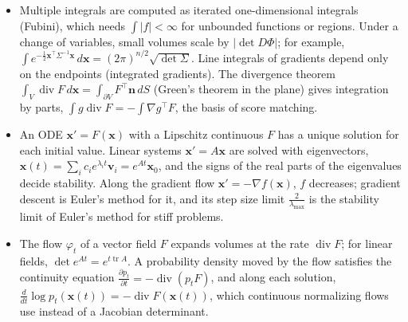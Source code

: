 \documentclass[11pt]{article}
\theoremstyle{definition}
\theoremstyle{plain}
\theoremstyle{remark}
\DeclareMathOperator{\tr}{tr}
\DeclareMathOperator{\Div}{div}
\begin{document}
\begin{itemize}[leftmargin=*]
    \item Multiple integrals are computed as iterated one-dimensional integrals (Fubini), which needs $\int |f| < \infty$ for unbounded functions or regions. Under a change of variables, small volumes scale by $|\det D\Phi|$; for example, $\int e^{-\frac{1}{2}\mathbf{x}^\top\Sigma^{-1}\mathbf{x}}\, d\mathbf{x} = (2\pi)^{n/2}\sqrt{\det\Sigma}$. Line integrals of gradients depend only on the endpoints (integrated gradients). The divergence theorem $\int_V \Div F\, d\mathbf{x} = \int_{\partial V} F^\top\mathbf{n}\, dS$ (Green's theorem in the plane) gives integration by parts, $\int g\Div F = -\int \nabla g^\top F$, the basis of score matching.
    \item An ODE $\mathbf{x}' = F(\mathbf{x})$ with a Lipschitz continuous $F$ has a unique solution for each initial value. Linear systems $\mathbf{x}' = A\mathbf{x}$ are solved with eigenvectors, $\mathbf{x}(t) = \sum_i c_ie^{\lambda_i t}\mathbf{v}_i = e^{At}\mathbf{x}_0$, and the signs of the real parts of the eigenvalues decide stability. Along the gradient flow $\mathbf{x}' = -\nabla f(\mathbf{x})$, $f$ decreases; gradient descent is Euler's method for it, and its step size limit $\frac{2}{\lambda_{\max}}$ is the stability limit of Euler's method for stiff problems.
    \item The flow $\varphi_t$ of a vector field $F$ expands volumes at the rate $\Div F$; for linear fields, $\det e^{At} = e^{t\tr A}$. A probability density moved by the flow satisfies the continuity equation $\frac{\partial p_t}{\partial t} = -\Div(p_tF)$, and along each solution, $\frac{d}{dt}\log p_t(\mathbf{x}(t)) = -\Div F(\mathbf{x}(t))$, which continuous normalizing flows use instead of a Jacobian determinant.
\end{itemize}
\end{document}
